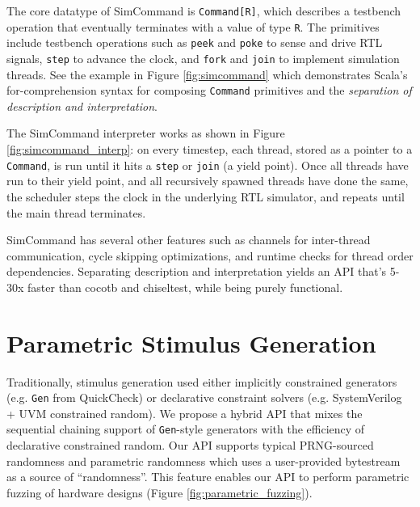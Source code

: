 \documentclass[sigplan,review,nonacm,9pt]{acmart}
\begin{document}
The core datatype of SimCommand is \texttt{Command[R]}, which describes a testbench operation that eventually terminates with a value of type \texttt{R}.
The primitives include testbench operations such as \texttt{peek} and \texttt{poke} to sense and drive RTL signals, \texttt{step} to advance the clock, and \texttt{fork} and \texttt{join} to implement simulation threads.
See the example in Figure \ref{fig:simcommand} which demonstrates Scala's for-comprehension syntax for composing \texttt{Command} primitives and the \textit{separation of description and interpretation}.

The SimCommand interpreter works as shown in Figure \ref{fig:simcommand_interp}: on every timestep, each thread, stored as a pointer to a \texttt{Command}, is run until it hits a \texttt{step} or \texttt{join} (a yield point).
Once all threads have run to their yield point, and all recursively spawned threads have done the same, the scheduler steps the clock in the underlying RTL simulator, and repeats until the main thread terminates.

SimCommand has several other features such as channels for inter-thread communication, cycle skipping optimizations, and runtime checks for thread order dependencies.
Separating description and interpretation yields an API that's 5-30x faster than cocotb and chiseltest, while being purely functional.


\section{Parametric Stimulus Generation}

Traditionally, stimulus generation used either implicitly constrained generators (e.g. \texttt{Gen} from QuickCheck\cite{quickcheck}) or declarative constraint solvers (e.g. SystemVerilog + UVM constrained random\cite{riscv_dv}).
We propose a hybrid API that mixes the sequential chaining support of \texttt{Gen}-style generators with the efficiency of declarative constrained random.
Our API supports typical PRNG-sourced randomness and parametric randomness which uses a user-provided bytestream as a source of ``randomness''.
This feature enables our API to perform parametric fuzzing\cite{zest} of hardware designs (Figure \ref{fig:parametric_fuzzing}).
\end{document}
